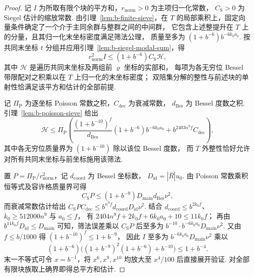 \begin{proof}
记 $I$ 为所取有限个块的平方和，$r_{\mathrm{norm}}>0$ 为主项归一化常数，
$C_{\mathrm{S}}>0$ 为 Siegel 估计的缩放常数.
由引理~\ref{lem:b-finite-sieve}，在 $T$ 的局部乘积上，固定向量条件确定了一个介于主同余群与整群之间的中间群，
它包含上述整提升在 $T$ 上的分量，且其归一化末坐标密度满足筛法公理，
质量至多为 $(1+b^{-6})b^{-6k_0a_0}$.
按共同末坐标 $t$ 分组并应用引理~\ref{lem:b-siegel-modal-sum}，得
\[
 r_{\mathrm{norm}}^2 I
 \le (1+b^{-6}) C_{\mathrm{S}}\mathcal H ,
\]
其中 $\mathcal H$ 是遍历共同末坐标及两组前 $\varrho$ 坐标的实部和，
每项为各无穷位 Bessel 带限配对之积乘以在 $T$ 上归一化的末坐标密度；
双陪集分解的整性与前述块的单射性恰满足该平方和估计的全部前提.

记 $\Pi_{\mathrm P}$ 为逐坐标 Poisson 常数之积，$C_{\mathrm{dec}}$ 为衰减常数，
$d_{\mathrm{Bes}}$ 为 Bessel 度数之积. 引理~\ref{lem:b-poisson-sieve} 给出
\[
 \mathcal H\le \Pi_{\mathrm P}
 \left(\frac{(1+b^{-10})^f}{d_{\mathrm{Bes}}}(1+b^{-6})b^{-6k_0a_0}
          +b^{2403n^9 f}C_{\mathrm{dec}}\right),
\]
其中各无穷位质量界为 $(1+b^{-10})$ 除以该位 Bessel 度数，
而 $T$ 外整性恰好允许对所有共同末坐标与前坐标施用该筛法.

置 $P=\Pi_{\mathrm P}/r_{\mathrm{norm}}^2$，记 $d_{\mathrm{coord}}$ 为 Bessel 坐标数，
$D_{\mathrm{id}}=|\overline R|u_0$. 由 Poisson 常数乘积恒等式及容许格质量界可得
\[
 C_{\mathrm S}P\le(1+b^{-9})D_{\mathrm{main}}d_{\mathrm{Bes}}\nu^2 ,
\]
而衰减常数估计给出
$C_{\mathrm S}PC_{\mathrm{dec}}\le b^{n^9f}d_{\mathrm{coord}}D_{\mathrm{id}}\nu^2$.
结合 $d_{\mathrm{coord}}\le b^{2k_0f}$、$k_0\ge512000n^9$ 与 $a_0\le f$，
有 $2404n^9f+2k_0f+6k_0a_0+10\le11k_0f$；
再由 $b^{11k_0f}D_{\mathrm{id}}\le D_{\mathrm{main}}$ 可知，筛法误差乘以
$C_{\mathrm S}P$ 后至多为 $b^{-10}\cdot b^{-6k_0a_0}D_{\mathrm{main}}\nu^2$.
又由 $f\le b/1000$ 得 $(1+b^{-10})^f\le1+b^{-9}$，
因此 $I$ 至多为 $b^{-6k_0a_0}D_{\mathrm{main}}\nu^2$ 乘以
\[
 (1+b^{-6})\bigl((1+b^{-9})^2(1+b^{-6})+b^{-10}\bigr)\le1+b^{-4}.
\]
末一不等式可令 $x=b^{-1}$，将 $x^6,x^9,x^{10}$ 均放大至 $x^4/100$ 后直接展开验证.
对全部有限块族取上确界即得总平方和估计.
\end{proof}

